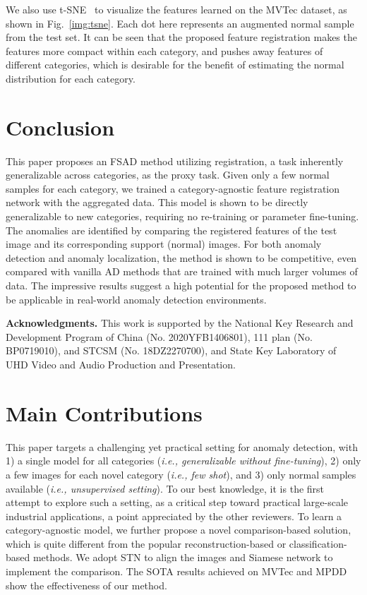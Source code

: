 \documentclass[runningheads]{llncs}
\begin{document}
We also use t-SNE~\cite{maaten2008visualizing} to visualize the features learned on the MVTec dataset, as shown in Fig.~\ref{img:tsne}. Each dot here represents an augmented normal sample from the test set. It can be seen that the proposed feature registration makes the features more compact within each category, and pushes away features of different categories, which is desirable for the benefit of estimating the normal distribution for each category.

\section{Conclusion}
This paper proposes an FSAD method utilizing registration, a task inherently generalizable across categories, as the proxy task. Given only a few normal samples for each category, we trained a category-agnostic feature registration network with the aggregated data. This model is shown to be directly generalizable to new categories, requiring no re-training or parameter fine-tuning. The anomalies are identified by comparing the registered features of the test image and its corresponding support (normal) images.  For both anomaly detection and anomaly localization, the method is shown to be competitive, even compared with vanilla AD methods that are trained with much larger volumes of data. The impressive results suggest a high potential for the proposed method to be applicable in real-world anomaly detection environments.

\textbf{Acknowledgments.}
This work is supported by the National Key Research and Development Program of China (No. 2020YFB1406801), 111 plan (No. BP0719010),  and STCSM (No. 18DZ2270700), and State Key Laboratory of UHD Video and Audio Production and Presentation.




\appendix

\section{Main Contributions}

This paper targets a challenging yet practical setting for anomaly detection, with 1) a single model for all categories (\emph{i.e., generalizable without fine-tuning}), 2) only a few images for each novel category (\emph{i.e., few shot}), and 3) only normal samples available (\emph{i.e., unsupervised setting}). To our best knowledge, it is the first attempt to explore such a setting, as a critical step toward practical large-scale industrial applications, a point appreciated by the other reviewers. To learn a category-agnostic model, we further propose a novel comparison-based solution, which is quite different from the popular reconstruction-based or classification-based methods. We adopt STN to align the images and Siamese network to implement the comparison. The SOTA results achieved on MVTec and MPDD show the effectiveness of our method.
\end{document}
